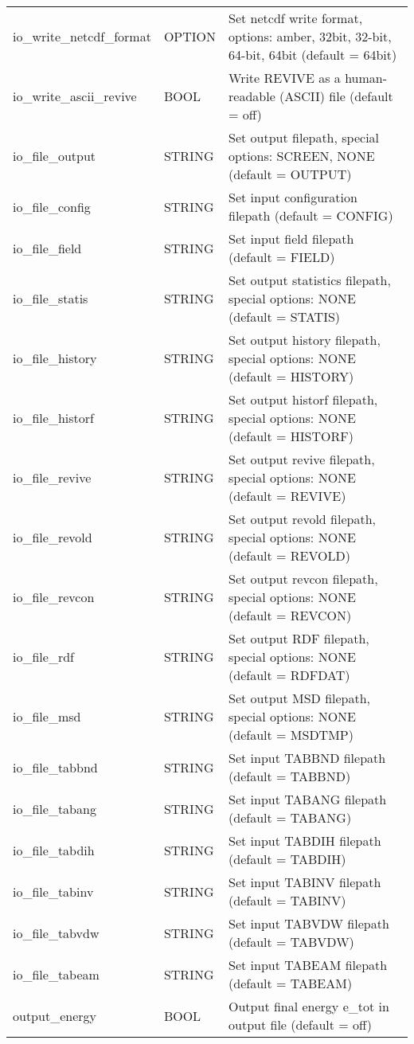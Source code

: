 \begin{longtable}{l l p{10cm}}
io\_write\_netcdf\_format & OPTION & Set netcdf write format, options: amber, 32bit, 32-bit, 64-bit, 64bit (default = 64bit) \\
io\_write\_ascii\_revive & BOOL & Write REVIVE as a human-readable (ASCII) file (default = off) \\
io\_file\_output & STRING & Set output filepath, special options: SCREEN, NONE (default = OUTPUT) \\
io\_file\_config & STRING & Set input configuration filepath (default = CONFIG) \\
io\_file\_field & STRING & Set input field filepath (default = FIELD) \\
io\_file\_statis & STRING & Set output statistics filepath, special options: NONE (default = STATIS) \\
io\_file\_history & STRING & Set output history filepath, special options: NONE (default = HISTORY) \\
io\_file\_historf & STRING & Set output historf filepath, special options: NONE (default = HISTORF) \\
io\_file\_revive & STRING & Set output revive filepath, special options: NONE (default = REVIVE) \\
io\_file\_revold & STRING & Set output revold filepath, special options: NONE (default = REVOLD) \\
io\_file\_revcon & STRING & Set output revcon filepath, special options: NONE (default = REVCON) \\
io\_file\_rdf & STRING & Set output RDF filepath, special options: NONE (default = RDFDAT) \\
io\_file\_msd & STRING & Set output MSD filepath, special options: NONE (default = MSDTMP) \\
io\_file\_tabbnd & STRING & Set input TABBND filepath (default = TABBND) \\
io\_file\_tabang & STRING & Set input TABANG filepath (default = TABANG) \\
io\_file\_tabdih & STRING & Set input TABDIH filepath (default = TABDIH) \\
io\_file\_tabinv & STRING & Set input TABINV filepath (default = TABINV) \\
io\_file\_tabvdw & STRING & Set input TABVDW filepath (default = TABVDW) \\
io\_file\_tabeam & STRING & Set input TABEAM filepath (default = TABEAM) \\
output\_energy & BOOL & Output final energy e\_tot in output file (default = off) \\

\end{longtable}
